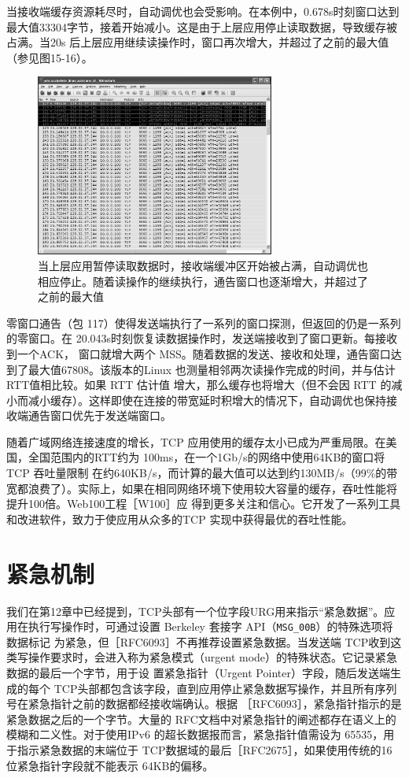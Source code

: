 当接收端缓存资源耗尽时，自动调优也会受影响。在本例中，0.678s时刻窗口达到最大值33304字节，接着开始减小。这是由于上层应用停止读取数据，导致缓存被占满。当20s
后上层应用继续读操作时，窗口再次增大，并超过了之前的最大值（参见图15-16）。
\begin{figure}[!htb]
    \centering
	\includegraphics[width=0.7\textwidth]{imgs/15/15-16.png}
	\caption{当上层应用暂停读取数据时，接收端缓冲区开始被占满，自动调优也相应停止。随着读操作的继续执行，通告窗口也逐渐增大，并超过了之前的最大值}
\end{figure}

零窗口通告（包 117）使得发送端执行了一系列的窗口探测，但返回的仍是一系列的零窗口。在 20.043s时刻恢复读数据操作时，发送端接收到了窗口更新。每接收到一个ACK，
窗口就增大两个 MSS。随着数据的发送、接收和处理，通告窗口达到了最大值67808。该版本的Linux 也测量相邻两次读操作完成的时间，并与估计 RTT值相比较。如果 RTT 估计值
增大，那么缓存也将增大（但不会因 RTT 的减小而减小缓存）。这样即使在连接的带宽延时积增大的情况下，自动调优也保持接收端通告窗口优先于发送端窗口。

随着广域网络连接速度的增长，TCP 应用使用的缓存太小已成为严重局限。在美国，全国范围内的RTT约为 100ms，在一个1Gb/s的网络中使用64KB的窗口将 TCP 吞吐量限制
在约640KB/s，而计算的最大值可以达到约130MB/s（99\%的带宽都浪费了）。实际上，如果在相同网络环境下使用较大容量的缓存，吞吐性能将提升100倍。Web100工程［W100］应
得到更多关注和信心。它开发了一系列工具和改进软件，致力于使应用从众多的TCP 实现中获得最优的吞吐性能。

\section{紧急机制}
我们在第12章中已经提到，TCP头部有一个位字段URG用来指示“紧急数据”。应用在执行写操作时，可通过设置 Berkeley 套接字 API（\verb|MSG_00B|）的特殊选项将数据标记
为紧急，但［RFC6093］不再推荐设置紧急数据。当发送端 TCP收到这类写操作要求时，会进入称为紧急模式（urgent mode）的特殊状态。它记录紧急数据的最后一个字节，用于设
置紧急指针（Urgent Pointer）字段，随后发送端生成的每个 TCP头部都包含该字段，直到应用停止紧急数据写操作，并且所有序列号在紧急指针之前的数据都经接收端确认。根据
［RFC6093］，紧急指针指示的是紧急数据之后的一个字节。大量的 RFC文档中对紧急指针的阐述都存在语义上的模糊和二义性。对于使用IPv6 的超长数据报而言，紧急指针值需设为
65535，用于指示紧急数据的末端位于 TCP数据域的最后［RFC2675］，如果使用传统的16位紧急指针字段就不能表示 64KB的偏移。

